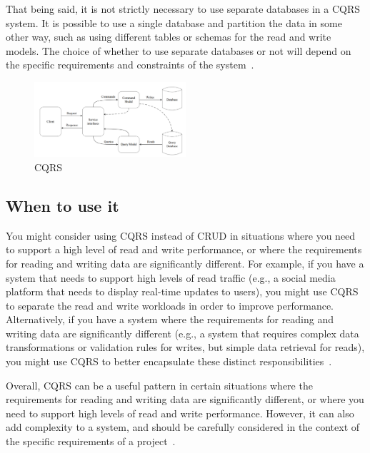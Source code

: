 \documentclass[11pt,conference]{IEEEtran}
\begin{document}
That being said, it is not strictly necessary to use separate databases in a CQRS system. It is possible to use a single database and partition the data in some other way, such as using different tables or schemas for the read and write models. The choice of whether to use separate databases or not will depend on the specific requirements and constraints of the system~\cite{martinfowler-cqrs}.

\begin{figure}[h]
    \centering
    \includegraphics[width=0.5\textwidth]{images/CQRS.png}
    \caption{CQRS~\cite[15]{cqrs-in-practise}}
    \label{fig:cqrs}
\end{figure}

\subsection{When to use it}

You might consider using CQRS instead of CRUD in situations where you need to support a high level of read and write performance, or where the requirements for reading and writing data are significantly different. For example, if you have a system that needs to support high levels of read traffic (e.g., a social media platform that needs to display real-time updates to users), you might use CQRS to separate the read and write workloads in order to improve performance. Alternatively, if you have a system where the requirements for reading and writing data are significantly different (e.g., a system that requires complex data transformations or validation rules for writes, but simple data retrieval for reads), you might use CQRS to better encapsulate these distinct responsibilities~\cite{martinfowler-cqrs}.

Overall, CQRS can be a useful pattern in certain situations where the requirements for reading and writing data are significantly different, or where you need to support high levels of read and write performance. However, it can also add complexity to a system, and should be carefully considered in the context of the specific requirements of a project~\cite{martinfowler-cqrs}.
\end{document}
